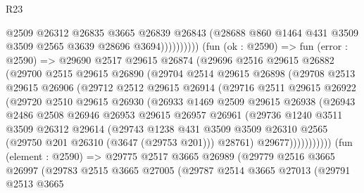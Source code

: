 \begin{lexlean}{R23}
\begin{coremodule}
                          @2509
                          @26312
                          @26835
                          @3665
                          @26839
                          @26843
                          (@28688 @860 @1464 @431 @3509 @3509 @2565 @3639 @28696 @3694))))))))))
        (fun (ok : @2590) =>
        fun (error : @2590) =>
        @29690
          @2517
          @29615
          @26874
          (@29696
            @2516
            @29615
            @26882
            (@29700
              @2515
              @29615
              @26890
              (@29704
                @2514
                @29615
                @26898
                (@29708
                  @2513
                  @29615
                  @26906
                  (@29712
                    @2512
                    @29615
                    @26914
                    (@29716
                      @2511
                      @29615
                      @26922
                      (@29720
                        @2510
                        @29615
                        @26930
                        (@26933
                          @1469
                          @2509
                          @29615
                          @26938
                          (@26943
                            @2486
                            @2508
                            @26946
                            @26953
                            @29615
                            @26957
                            @26961
                            (@29736
                              @1240
                              @3511
                              @3509
                              @26312
                              @29614
                              (@29743
                                @1238
                                @431
                                @3509
                                @3509
                                @26310
                                @2565
                                (@29750 @201 @26310 (@3647 (@29753 @201)))
                                @28761)
                              @29677)))))))))))
        (fun (element : @2590) =>
        @29775
          @2517
          @3665
          @26989
          (@29779
            @2516
            @3665
            @26997
            (@29783
              @2515
              @3665
              @27005
              (@29787
                @2514
                @3665
                @27013
                (@29791
                  @2513
                  @3665

\end{coremodule}
\end{lexlean}
